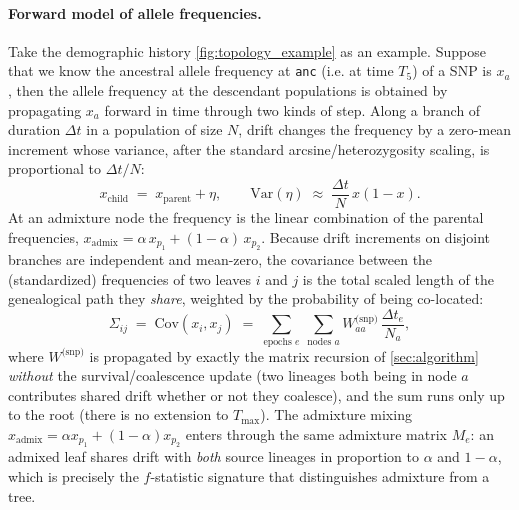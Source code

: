 \documentclass[12pt]{article}
\theoremstyle{definition}
\theoremstyle{definition}
\theoremstyle{lemma}
\theoremstyle{remark}
\theoremstyle{definition}
\begin{document}
\paragraph{Forward model of allele frequencies.}
Take the demographic history \cref{fig:topology_example} as an example. Suppose
that we know the ancestral allele frequency at \texttt{anc} (i.e. at time $T_5$)
of a SNP is $x_a$, then the allele frequency at the descendant populations is
obtained by propagating $x_a$ forward in time through two kinds of step. Along a
branch of duration $\Delta t$ in a population of size $N$, drift changes the
frequency by a zero-mean increment whose variance, after the standard
arcsine/heterozygosity scaling, is proportional to $\Delta t / N$:
\[
  x_{\text{child}} \;=\; x_{\text{parent}} + \eta,
  \qquad \mathrm{Var}(\eta) \;\approx\; \frac{\Delta t}{N}\, x(1-x).
\]
At an admixture node the frequency is the linear combination of the parental
frequencies, $x_{\text{admix}} = \alpha\, x_{p_1} + (1-\alpha)\, x_{p_2}$. Because
drift increments on disjoint branches are independent and mean-zero, the
covariance between the (standardized) frequencies of two leaves $i$ and $j$ is the
total scaled length of the genealogical path they \emph{share}, weighted by the
probability of being co-located:
\[
  \Sigma_{ij} \;=\; \mathrm{Cov}(x_i, x_j)
  \;=\; \sum_{\text{epochs } e}\ \sum_{\text{nodes } a}
  W^{\text{(snp)}}_{aa}\,\frac{\Delta t_e}{N_a},
\]
where $W^{\text{(snp)}}$ is propagated by exactly the matrix recursion of
\cref{sec:algorithm} \emph{without} the survival/coalescence update (two lineages
both being in node $a$ contributes shared drift whether or not they coalesce),
and the sum runs only up to the root (there is no extension to $T_{\max}$). The
admixture mixing $x_{\text{admix}}=\alpha x_{p_1}+(1-\alpha)x_{p_2}$ enters through
the same admixture matrix $M_e$: an admixed leaf shares drift with \emph{both}
source lineages in proportion to $\alpha$ and $1-\alpha$, which is precisely the
$f$-statistic signature that distinguishes admixture from a tree.
\end{document}
